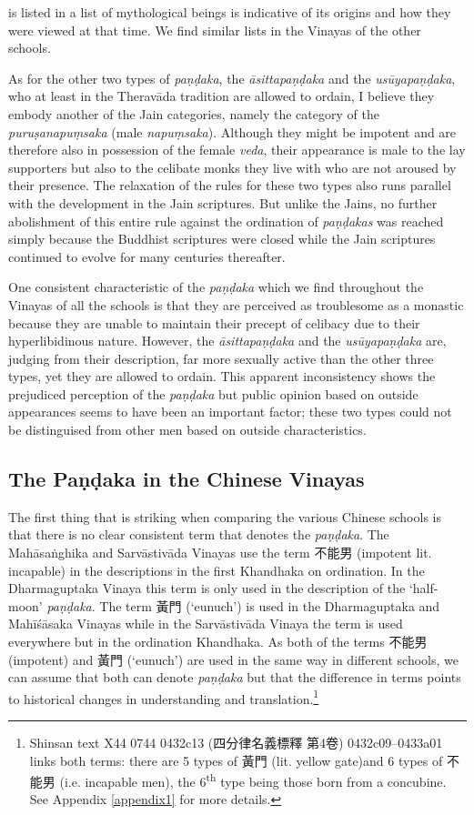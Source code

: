 is listed in a list of mythological beings is indicative of its origins and how they were viewed at that time. We find similar lists in the Vinayas of the other schools.

As for the other two types of {\em paṇḍaka}, the {\em āsittapaṇḍaka} and the {\em usūyapaṇḍaka}, who at least in the Theravāda tradition are allowed to ordain, I believe they embody another of the Jain categories, namely the category of the {\em puruṣanapuṃsaka} (male {\em napuṃsaka}). Although they might be impotent and are therefore also in possession of the female {\em veda}, their appearance is male to the lay supporters but also to the celibate monks they live with who are not aroused by their presence. The relaxation of the rules for these two types also runs parallel with the development in the Jain scriptures. But unlike the Jains, no further abolishment of this entire rule against the ordination of {\em paṇḍakas} was reached simply because the Buddhist scriptures were closed while the Jain scriptures continued to evolve for many centuries thereafter.

One consistent characteristic of the {\em paṇḍaka} which we find throughout the Vinayas of all the schools is that they are perceived as troublesome as a monastic because they are unable to maintain their precept of celibacy due to their hyperlibidinous nature. However, the {\em āsittapaṇḍaka} and the {\em usūyapaṇḍaka} are, judging from their description, far more sexually active than the other three types, yet they are allowed to ordain. This apparent inconsistency shows the prejudiced perception of the {\em paṇḍaka} but public opinion based on outside appearances seems to have been an important factor; these two types could not be distinguised from other men based on outside characteristics. 

\subsection{The Paṇḍaka in the Chinese Vinayas}
The first thing that is striking when comparing the various Chinese schools is that there is no clear consistent term that denotes the {\em paṇḍaka}. The Mahāsaṅghika and Sarvāstivāda Vinayas use the term 不能男 (impotent lit. incapable) in the descriptions in the first Khandhaka on ordination. In the Dharmaguptaka Vinaya this term is only used in the description of the `half-moon' {\em paṇḍaka}. The term 黃門 (`eunuch') is used in the Dharmaguptaka and Mahīśāsaka Vinayas while in the Sarvāstivāda Vinaya the term is used everywhere but in the ordination Khandhaka. As both of the terms 不能男 (impotent) and 黃門 (`eunuch') are used in the same way in different schools, we can assume that both can denote {\em paṇḍaka} but that the difference in terms points to historical changes in understanding and translation.\footnote{Shinsan text X44 0744 0432c13 (四分律名義標釋 第4卷) 0432c09–0433a01 links both terms: there are 5 types of 黃門 (lit. yellow gate)and 6 types of 不能男 (i.e. incapable men), the 6\textsuperscript{th} type being those born from a concubine. See Appendix \ref{appendix1} for more details.}

